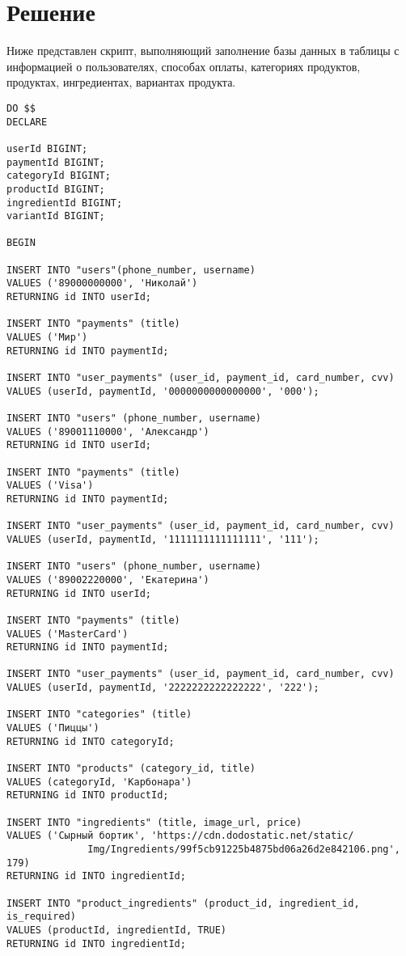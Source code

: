 \documentclass[a4paper,14pt]{extarticle}
\begin{document}
  \pagebreak
  \section*{Решение}
  Ниже представлен скрипт, выполняющий заполнение базы данных в таблицы с информацией о пользователях, способах оплаты, категориях продуктов, продуктах, ингредиентах, вариантах продукта.

  \noindent
  \begin{Verbatim}[tabsize=4,fontsize=\small]
DO $$
DECLARE

userId BIGINT;
paymentId BIGINT;
categoryId BIGINT;
productId BIGINT;
ingredientId BIGINT;
variantId BIGINT;

BEGIN

INSERT INTO "users"(phone_number, username)
VALUES ('89000000000', 'Николай')
RETURNING id INTO userId;

INSERT INTO "payments" (title)
VALUES ('Мир')
RETURNING id INTO paymentId;

INSERT INTO "user_payments" (user_id, payment_id, card_number, cvv)
VALUES (userId, paymentId, '0000000000000000', '000');

INSERT INTO "users" (phone_number, username)
VALUES ('89001110000', 'Александр')
RETURNING id INTO userId;

INSERT INTO "payments" (title)
VALUES ('Visa')
RETURNING id INTO paymentId;

INSERT INTO "user_payments" (user_id, payment_id, card_number, cvv)
VALUES (userId, paymentId, '1111111111111111', '111');

INSERT INTO "users" (phone_number, username)
VALUES ('89002220000', 'Екатерина')
RETURNING id INTO userId;

INSERT INTO "payments" (title)
VALUES ('MasterCard')
RETURNING id INTO paymentId;

INSERT INTO "user_payments" (user_id, payment_id, card_number, cvv)
VALUES (userId, paymentId, '2222222222222222', '222');

INSERT INTO "categories" (title)
VALUES ('Пиццы')
RETURNING id INTO categoryId;

INSERT INTO "products" (category_id, title)
VALUES (categoryId, 'Карбонара')
RETURNING id INTO productId;

INSERT INTO "ingredients" (title, image_url, price)
VALUES ('Сырный бортик', 'https://cdn.dodostatic.net/static/
              Img/Ingredients/99f5cb91225b4875bd06a26d2e842106.png', 179)
RETURNING id INTO ingredientId;

INSERT INTO "product_ingredients" (product_id, ingredient_id, is_required)
VALUES (productId, ingredientId, TRUE)
RETURNING id INTO ingredientId;


\end{Verbatim}
\end{document}
